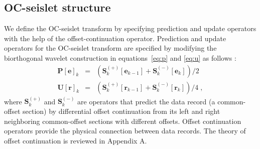 \subsection{OC-seislet structure}

We define the OC-seislet transform by specifying prediction and update
operators with the help of the offset-continuation
operator. Prediction and update operators for the OC-seislet transform
are specified by modifying the biorthogonal wavelet construction in
equations~\ref{eq:p} and \ref{eq:u} as follows
\cite[]{Fomel06,Fomel10}:
\begin{eqnarray}
  \label{eq:sp}
  \mathbf{P[e]}_k & = & 
    \left(\mathbf{S}_k^{(+)}[\mathbf{e}_{k-1}] + 
  \mathbf{S}_k^{(-)}[\mathbf{e}_{k}]\right)/2 \\
  \label{eq:su}
  \mathbf{U[r]}_k & = & 
     \left(\mathbf{S}_k^{(+)}[\mathbf{r}_{k-1}] + 
    \mathbf{S}_k^{(-)}[\mathbf{r}_{k}]\right)/4\;,
\end{eqnarray}
where $\mathbf{S}_k^{(+)}$ and $\mathbf{S}_k^{(-)}$ are operators that
predict the data record (a common-offset section) by differential
offset continuation from its left and right neighboring common-offset
sections with different offsets. Offset continuation operators provide
the physical connection between data records. The theory of offset
continuation is reviewed in Appendix A.

